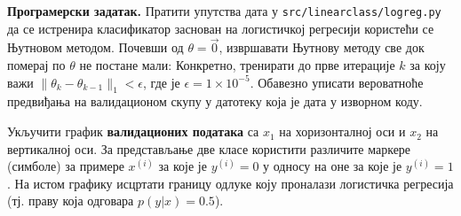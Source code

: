 \item {} \textbf{Програмерски задатак.}
Пратити упутства дата у \texttt{src/linearclass/logreg.py} да се истренира класификатор заснован на логистичкој регресији користећи се Њутновом методом. Почевши од $\theta = \vec{0}$, извршавати Њутнову методу све док померај по $\theta$ не постане мали: Конкретно, тренирати до прве итерације $k$ за коју важи $\|\theta_{k} - \theta_{k-1}\|_1 < \epsilon$, где је $\epsilon = 1\times 10^{-5}$. Обавезно уписати вероватноће предвиђања на валидационом скупу у датотеку која је дата у изворном коду.

Укључити график \textbf{валидационих података} са $x_1$ на хоризонталној оси и $x_2$ на вертикалној оси. За представљање две класе користити различите маркере (симболе) за примере $x^{(i)}$ за које је $y^{(i)} = 0$ у односу на оне за које је $y^{(i)} = 1$. На истом графику исцртати границу одлуке коју проналази логистичка регресија (тј. праву која одговара $p(y|x) = 0.5$).

